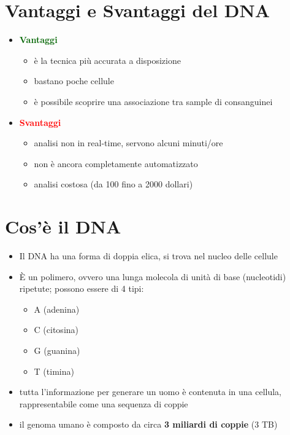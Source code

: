 \documentclass{report}
\begin{document}
\section{Vantaggi e Svantaggi del DNA}

\begin{itemize}
    \item \textcolor{darkgreen}{\textbf{Vantaggi}}
    \begin{itemize}
        \item è la tecnica più accurata a disposizione 
        \item bastano poche cellule 
        \item è possibile scoprire una associazione tra sample di consanguinei
    \end{itemize}
    \item \textcolor{red}{\textbf{Svantaggi}}
    \begin{itemize}
        \item analisi non in real-time, servono alcuni minuti/ore 
        \item non è ancora completamente automatizzato 
        \item analisi costosa (da 100 fino a 2000 dollari)
    \end{itemize}
\end{itemize}



\section{Cos'è il DNA}
\begin{itemize}
    \item Il DNA ha una forma di doppia elica, si trova nel nucleo delle cellule
    \item È un polimero, ovvero una lunga molecola di unità di base (nucleotidi) ripetute;
    possono essere di 4 tipi:
    \begin{itemize}
        \item A (adenina)
        \item C (citosina)
        \item G (guanina)
        \item T (timina)
    \end{itemize}
    \item tutta l'informazione per generare un uomo è contenuta in una cellula, rappresentabile 
    come una sequenza di coppie
    \item il genoma umano è composto da circa \textbf{3 miliardi di coppie} (3 TB)
\end{itemize}
\end{document}
